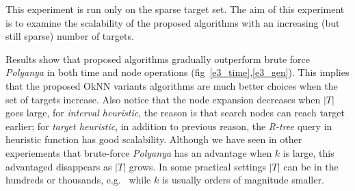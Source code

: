 This experiment is run only on the sparse target set. The aim of this experiment is to examine the scalability of the proposed algorithms with an increasing
(but still sparse) number of targets.

Results show that proposed algorithms gradually outperform brute force \textit{Polyanya} in both time and node operations (fig~\ref{e3_time},\ref{e3_gen}).
This implies that the proposed OkNN variants algorithms are much better choices when the set of targets increase. 
Also notice that the node expansion decreases when $|T|$ goes large,
for \textit{interval heuristic}, the reason is that search nodes can reach target earlier; for
\textit{target heuristic}, in addition to previous reason, the \textit{R-tree} query in
heuristic function has good scalability. 
Although we have seen in other experiements that brute-force \textit{Polyanya} has an advantage when $k$ is large, this advantaged disappears as $|T|$ grows.
In some practical settings $|T|$ can be in the hundreds or thousands, e.g.~\cite{abeywickrama2016k} while $k$ is usually orders of magnitude smaller. 
